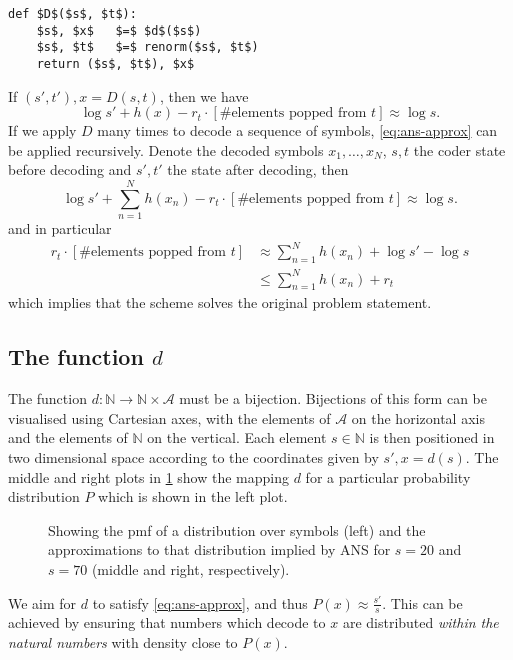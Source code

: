 \documentclass{article}
\begin{document}
\begin{lstlisting}
def $D$($s$, $t$):
    $s$, $x$   $=$ $d$($s$)
    $s$, $t$   $=$ renorm($s$, $t$)
    return ($s$, $t$), $x$
\end{lstlisting}
If $(s', t'), x = D(s, t)$, then we have
\begin{equation}\label{eq:ans-approx}
        \log s' + h(x) - r_t\cdot\left[\text{\# elements popped from $t$}\right]
        \approx \log s.
\end{equation}
If we apply $D$ many times to decode a sequence of symbols,
\cref{eq:ans-approx} can be applied recursively. Denote the decoded symbols
$x_1, \ldots, x_N$, $s, t$ the coder state before decoding and $s', t'$ the
state after decoding, then
\begin{equation}
        \log s' + \sum_{n=1}^Nh(x_n) - r_t\cdot\left[\text{\# elements popped
        from $t$}\right] \approx \log s.
\end{equation}
and in particular
\begin{align}
         r_t\cdot\left[\text{\# elements popped
         from $t$}\right] &\approx \sum_{n=1}^Nh(x_n) + \log s' - \log s\\
                          &\leq \sum_{n=1}^Nh(x_n) + r_t
\end{align}
which implies that the scheme solves the original problem statement.

\subsection*{The function $d$}\label{sec:inner-decoder}
The function $d:\mathbb{N}\rightarrow\mathbb{N}\times\mathcal{A}$ must be a
bijection. Bijections of this form can be visualised using Cartesian axes, with
the elements of $\mathcal{A}$ on the horizontal axis and the elements of
$\mathbb{N}$ on the vertical. Each element $s\in\mathbb{N}$ is then positioned
in two dimensional space according to the coordinates given by $s', x = d(s)$.
The middle and right plots in \cref{fig:visual-ans} show the mapping $d$ for a
particular probability distribution $P$ which is shown in the left plot.
\begin{figure}[t]
  \centering
  \drawpmf \quad {} \quad {}
  \caption{
    Showing the pmf of a distribution over symbols (left) and the
    approximations to that distribution implied by ANS for $s=20$ and $s=70$
    (middle and right, respectively).}\label{fig:visual-ans}
\end{figure}

We aim for $d$ to satisfy \cref{eq:ans-approx}, and thus $P(x)\approx
\frac{s'}{s}$. This can be achieved by ensuring that numbers which decode to $x$
are distributed \emph{within the natural numbers} with density close to $P(x)$.

\printbibliography
\end{document}
